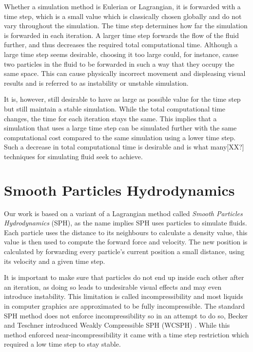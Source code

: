 \documentclass[../../main.tex]{subfiles}
\begin{document}
Whether a simulation method is Eulerian or Lagrangian, it is forwarded with a time step, which is a small value which is classically chosen globally and do not vary throughout the simulation. The time step determines how far the simulation is forwarded in each iteration. A larger time step forwards the flow of the fluid further, and thus decreases the required total computational time. Although a large time step seems desirable, choosing it too large could, for instance, cause two particles in the fluid to be forwarded in such a way that they occupy the same space. This can cause physically incorrect movement and displeasing visual results and is referred to as instability or unstable simulation.

It is, however, still desirable to have as large as possible value for the time step but still maintain a stable simulation. While the total computational time changes, the time for each iteration stays the same. This implies that a simulation that uses a large time step can be simulated further with the same computational cost compared to the same simulation using a lower time step. Such a decrease in total computational time is desirable and is what many[XX?] techniques for simulating fluid seek to achieve.


\section{Smooth Particles Hydrodynamics}
Our work is based on a variant of a Lagrangian method called \textit{Smooth Particles Hydrodynamics} (SPH), as the name implies SPH uses particles to simulate fluids. Each particle uses the distance to its neighbours to calculate a density value, this value is then used to compute the forward force and velocity. The new position is calculated by forwarding every particle's current position a small distance, using its velocity and a given time step. 

It is important to make sure that particles do not end up inside each other after an iteration, as doing so leads to undesirable visual effects and may even introduce instability. This limitation is called incompressibility and most liquids in computer graphics are approximated to be fully incompressible. The standard SPH method does not enforce incompressibility so in an attempt to do so, Becker and Teschner introduced Weakly Compressible SPH (WCSPH) \citep{becker2007weakly}. While this method enforced near-incompressibility it came with a time step restriction which required a low time step to stay stable.
\end{document}
